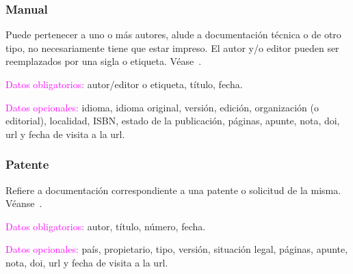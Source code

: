 \documentclass{book}
\begin{document}
{{{{{{{{{{{{{{{{{\subsubsection{Manual}

Puede pertenecer a uno o más autores, alude a documentación técnica o de otro tipo, no necesariamente tiene que estar impreso. El autor y/o editor pueden ser reemplazados por una sigla o etiqueta. Véase~\textcite{cms2003}.

\begin{compactdesc}
\item [\textcolor{magenta}{Datos obligatorios:}] autor/editor o etiqueta, título, fecha.
\item [\textcolor{magenta}{Datos opcionales:}] idioma, idioma original, versión, edición, organización (o editorial), localidad, ISBN, estado de la publicación, páginas, apunte, nota, doi, url y fecha de visita a la url.
\end{compactdesc}

\begin{mdframed}[linewidth=.5pt,linecolor=black!30,roundcorner=3pt,backgroundcolor=yellow!15]
\noindent\vspace{-12pt}
\printbibliography[keyword=manual,heading=none]
\end{mdframed}

\subsubsection{Patente}

Refiere a documentación correspondiente a una patente o solicitud de la misma. Véanse~\textcite{patentesorace,patentealmendro}.

\begin{compactdesc}
\item [\textcolor{magenta}{Datos obligatorios:}]  autor, título, número, fecha.
\item [\textcolor{magenta}{Datos opcionales:}] país, propietario, tipo, versión, situación legal, páginas, apunte, nota, doi, url y fecha de visita a la url.
\end{compactdesc}

\begin{mdframed}[linewidth=.5pt,linecolor=black!30,roundcorner=3pt,backgroundcolor=yellow!15]
\noindent\vspace{-12pt}
\printbibliography[keyword=patente,heading=none]
\end{mdframed}

}}}}}}}}}}}}}}}}}
\end{document}
